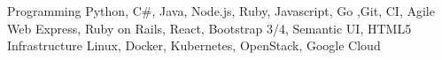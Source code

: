 \begin{cvskills}
  \cvskill
    {Programming}
    {Python, C\#, Java, Node.js, Ruby, Javascript, Go ,Git, CI, Agile}
  \cvskill
    {Web}
    {Express, Ruby on Rails, React, Bootstrap 3/4, Semantic UI, HTML5}
  \cvskill
    {Infrastructure}
    {Linux, Docker, Kubernetes, OpenStack, Google Cloud}
\end{cvskills}
